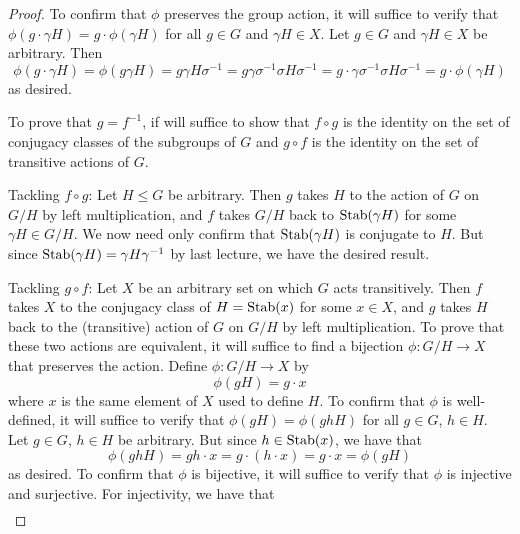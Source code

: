 \documentclass[../notes.tex]{subfiles}
\begin{document}
\begin{itemize}
\begin{proof}
        To confirm that $\phi$ preserves the group action, it will suffice to verify that $\phi(g\cdot\gamma H)=g\cdot\phi(\gamma H)$ for all $g\in G$ and $\gamma H\in X$. Let $g\in G$ and $\gamma H\in X$ be arbitrary. Then
        \begin{equation*}
            \phi(g\cdot\gamma H) = \phi(g\gamma H)
            = g\gamma H\sigma^{-1}
            = g\gamma\sigma^{-1}\sigma H\sigma^{-1}
            = g\cdot\gamma\sigma^{-1}\sigma H\sigma^{-1}
            = g\cdot\phi(\gamma H)
        \end{equation*}
        as desired.\par\smallskip
        To prove that $g=f^{-1}$, if will suffice to show that $f\circ g$ is the identity on the set of conjugacy classes of the subgroups of $G$ and $g\circ f$ is the identity on the set of transitive actions of $G$.\par
        Tackling $f\circ g$: Let $H\leq G$ be arbitrary. Then $g$ takes $H$ to the action of $G$ on $G/H$ by left multiplication, and $f$ takes $G/H$ back to $\operatorname{Stab}(\gamma H)$ for some $\gamma H\in G/H$. We now need only confirm that $\operatorname{Stab}(\gamma H)$ is conjugate to $H$. But since $\operatorname{Stab}(\gamma H)=\gamma H\gamma^{-1}$ by last lecture, we have the desired result.\par
        Tackling $g\circ f$: Let $X$ be an arbitrary set on which $G$ acts transitively. Then $f$ takes $X$ to the conjugacy class of $H=\operatorname{Stab}(x)$ for some $x\in X$, and $g$ takes $H$ back to the (transitive) action of $G$ on $G/H$ by left multiplication. To prove that these two actions are equivalent, it will suffice to find a bijection $\phi:G/H\to X$ that preserves the action. Define $\phi:G/H\to X$ by
        \begin{equation*}
            \phi(gH) = g\cdot x
        \end{equation*}
        where $x$ is the same element of $X$ used to define $H$. To confirm that $\phi$ is well-defined, it will suffice to verify that $\phi(gH)=\phi(ghH)$ for all $g\in G$, $h\in H$. Let $g\in G$, $h\in H$ be arbitrary. But since $h\in\operatorname{Stab}(x)$, we have that
        \begin{equation*}
            \phi(ghH) = gh\cdot x
            = g\cdot(h\cdot x)
            = g\cdot x
            = \phi(gH)
        \end{equation*}
        as desired. To confirm that $\phi$ is bijective, it will suffice to verify that $\phi$ is injective and surjective. For injectivity, we have that
        \begin{align*}

\end{align*}
\end{proof}
\end{itemize}
\end{document}
